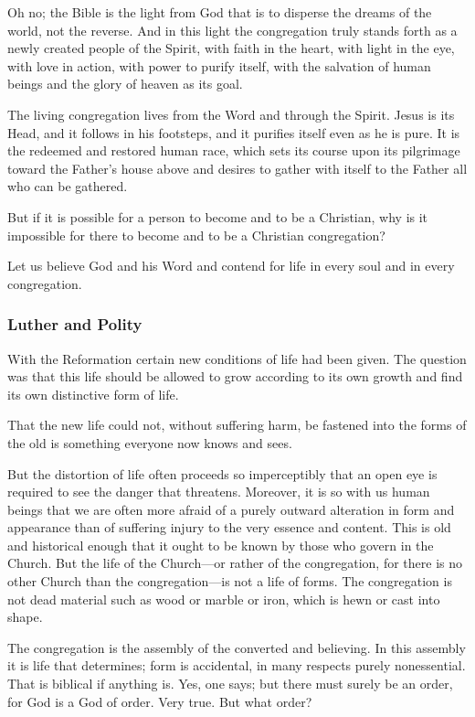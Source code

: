 Oh no; the Bible is the light from God that is to disperse the dreams of the world, not the reverse. And in this light the congregation truly stands forth as a newly created people of the Spirit, with faith in the heart, with light in the eye, with love in action, with power to purify itself, with the salvation of human beings and the glory of heaven as its goal.

The living congregation lives from the Word and through the Spirit. Jesus is its Head, and it follows in his footsteps, and it purifies itself even as he is pure. It is the redeemed and restored human race, which sets its course upon its pilgrimage toward the Father’s house above and desires to gather with itself to the Father all who can be gathered.

But if it is possible for a person to become and to be a Christian, why is it impossible for there to become and to be a Christian congregation?

Let us believe God and his Word and contend for life in every soul and in every congregation.

\subsubsection{Luther and Polity}

With the Reformation certain new conditions of life had been given. The question was that this life should be allowed to grow according to its own growth and find its own distinctive form of life.

That the new life could not, without suffering harm, be fastened into the forms of the old is something everyone now knows and sees.

But the distortion of life often proceeds so imperceptibly that an open eye is required to see the danger that threatens. Moreover, it is so with us human beings that we are often more afraid of a purely outward alteration in form and appearance than of suffering injury to the very essence and content. This is old and historical enough that it ought to be known by those who govern in the Church. But the life of the Church—or rather of the congregation, for there is no other Church than the congregation—is not a life of forms. The congregation is not dead material such as wood or marble or iron, which is hewn or cast into shape.

The congregation is the assembly of the converted and believing. In this assembly it is life that determines; form is accidental, in many respects purely nonessential. That is biblical if anything is. Yes, one says; but there must surely be an order, for God is a God of order. Very true. But what order?

